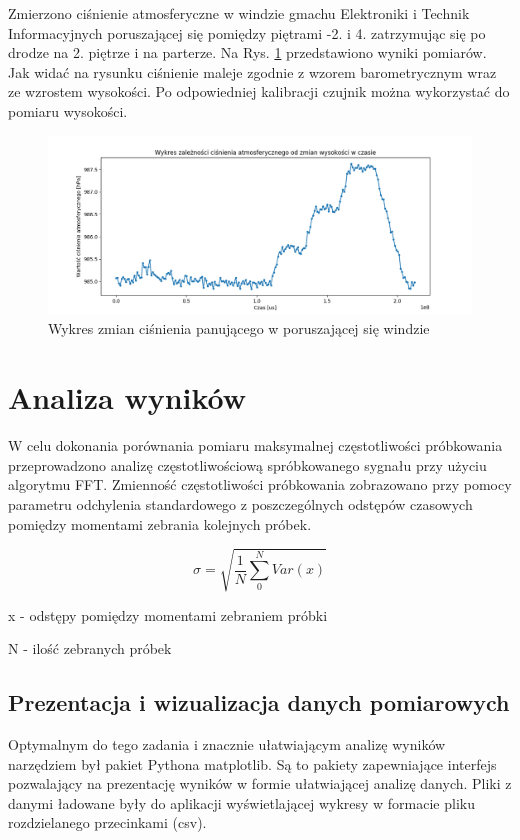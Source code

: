 Zmierzono ciśnienie atmosferyczne w windzie gmachu Elektroniki i Technik Informacyjnych poruszającej się pomiędzy piętrami -2. i 4. zatrzymując się po drodze na 2. piętrze i na parterze. Na Rys. \ref{fig:winda} przedstawiono wyniki pomiarów. Jak widać na rysunku ciśnienie maleje zgodnie z wzorem barometrycznym wraz ze wzrostem wysokości. Po odpowiedniej kalibracji czujnik można wykorzystać do pomiaru wysokości.


\begin{figure}[H]
	\centering
		\includegraphics[width=14cm]{winda}
	\caption{Wykres zmian ciśnienia panującego w poruszającej się windzie} 
	\label{fig:winda}
\end{figure}


\section{Analiza wyników}
W celu dokonania porównania pomiaru maksymalnej częstotliwości próbkowania przeprowadzono analizę częstotliwościową spróbkowanego sygnału przy użyciu algorytmu FFT.
Zmienność częstotliwości próbkowania zobrazowano przy pomocy parametru odchylenia standardowego z poszczególnych odstępów czasowych pomiędzy momentami zebrania kolejnych próbek.

\begin{equation}
\sigma=\sqrt{\dfrac{1}{N}\sum_{0}^{N}{Var(x)}}
\end{equation}

x - odstępy pomiędzy momentami zebraniem próbki

N - ilość zebranych próbek


\subsection{Prezentacja i wizualizacja danych pomiarowych}
Optymalnym do tego zadania i znacznie ułatwiającym analizę wyników narzędziem był pakiet Pythona matplotlib. Są to pakiety zapewniające interfejs pozwalający na prezentację wyników w formie ułatwiającej analizę danych. Pliki z danymi ładowane były do aplikacji wyświetlającej wykresy w formacie pliku rozdzielanego przecinkami (csv).  



